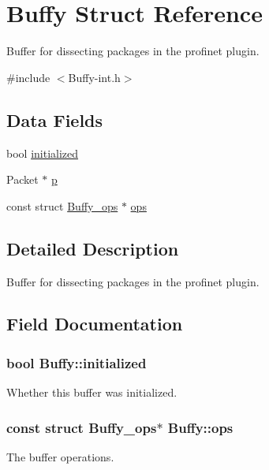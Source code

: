 \hypertarget{struct_buffy}{}\section{Buffy Struct Reference}
\label{struct_buffy}


Buffer for dissecting packages in the profinet plugin.  




{\ttfamily \#include $<$Buffy-\/int.\+h$>$}

\subsection*{Data Fields}
\begin{DoxyCompactItemize}
\item 
bool \hyperlink{struct_buffy_a7c348a4760832590feb6029e9887a266}{initialized}
\item 
Packet $\ast$ \hyperlink{struct_buffy_a31f5f80e4d23a823a8a7e9e26341600b}{p}
\item 
const struct \hyperlink{struct_buffy__ops}{Buffy\+\_\+ops} $\ast$ \hyperlink{struct_buffy_a104accd70cf0c88ec61f2577930e73f8}{ops}
\end{DoxyCompactItemize}


\subsection{Detailed Description}
Buffer for dissecting packages in the profinet plugin. 

\subsection{Field Documentation}
\hypertarget{struct_buffy_a7c348a4760832590feb6029e9887a266}{}
\subsubsection[{initialized}]{\setlength{\rightskip}{0pt plus 5cm}bool Buffy\+::initialized}\label{struct_buffy_a7c348a4760832590feb6029e9887a266}
Whether this buffer was initialized. \hypertarget{struct_buffy_a104accd70cf0c88ec61f2577930e73f8}{}
\subsubsection[{ops}]{\setlength{\rightskip}{0pt plus 5cm}const struct {\bf Buffy\+\_\+ops}$\ast$ Buffy\+::ops}\label{struct_buffy_a104accd70cf0c88ec61f2577930e73f8}
The buffer operations. \hypertarget{struct_buffy_a31f5f80e4d23a823a8a7e9e26341600b}{}
